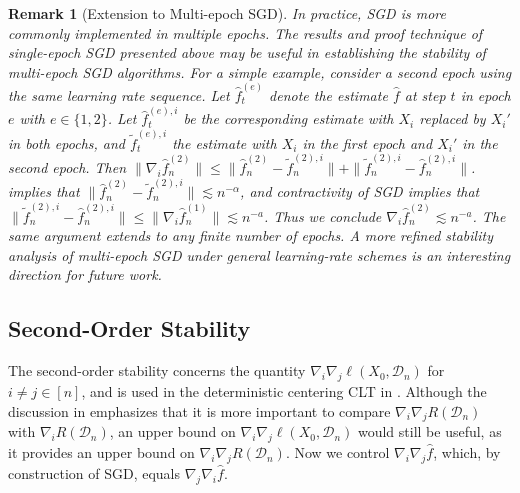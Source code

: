 \documentclass[11pt]{article}
\theoremstyle{plain}
\newtheorem{remark}[theorem]{Remark}
\newcommand{\D}{{\mathcal{D}}}
\begin{document}
\begin{remark}[Extension to Multi-epoch SGD]
    \label{rem:6.1-multi-epoch}
    In practice, SGD is more commonly implemented in multiple epochs.  The results and proof technique of single-epoch SGD presented above may be useful in establishing the stability of multi-epoch SGD algorithms.  For a simple example, consider a second epoch using the same learning rate sequence. Let $\hat f_t^{(e)}$ denote the estimate $\hat f$ at step $t$ in epoch $e$ with $e\in\{1,2\}$.
    Let $\hat f_t^{(e),i}$ be the corresponding estimate with $X_i$ replaced by $X_i'$ in both epochs, and $\tilde f_t^{(e),i}$ the estimate with $X_i$ in the first epoch and $X_i'$ in the second epoch.
    Then
    $\|\nabla_i \hat f_n^{(2)}\|\le \|\hat f_n^{(2)}-\tilde f_n^{(2),i}\|+\|\tilde f_n^{(2),i}-\hat f_n^{(2),i}\|$.
     implies that $\|\hat f_n^{(2)}-\tilde f_n^{(2),i}\|\lesssim n^{-\alpha}$, and contractivity of SGD implies that $\|\tilde f_n^{(2),i}-\hat f_n^{(2),i}\|\le \|\nabla_i \hat f_n^{(1)}\|\lesssim n^{-a}$. Thus we conclude $\nabla_i \hat f_n^{(2)}\lesssim n^{-a}$.  The same argument extends to any finite number of epochs.  A more refined stability analysis of multi-epoch SGD under general learning-rate schemes is an interesting direction for future work.
\end{remark}


\subsection{Second-Order Stability}\label{subsec:6.2-stab-sgd-2}
The second-order stability concerns the quantity $\nabla_i\nabla_j\ell(X_0,\D_n)$ for $i\neq j\in[n]$, and is used in the deterministic centering CLT in .  Although the discussion in  emphasizes that it is more important to compare $\nabla_i\nabla_j R(\D_n)$ with $\nabla_i R(\D_n)$,  an upper bound on $\nabla_i\nabla_j\ell(X_0,\D_n)$ would still be useful, as it provides an upper bound on $\nabla_i\nabla_j R(\D_n)$.
Now we control $\nabla_i\nabla_j\hat f$, which, by construction of SGD, equals $\nabla_j\nabla_i\hat f$. 
\end{document}
